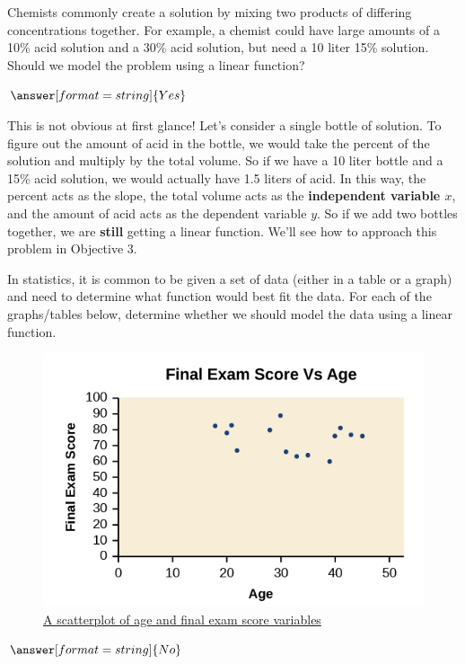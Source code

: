 \documentclass{ximera}
\begin{document}
\begin{question}
Chemists commonly create a solution by mixing two products of differing concentrations together. For example, a chemist could have large amounts of a 10\% acid solution and a 30\% acid solution, but need a 10 liter 15\% solution. Should we model the problem using a linear function?

$\answer[format=string]{Yes}$

\begin{feedback}
This is not obvious at first glance! Let's consider a single bottle of solution. To figure out the amount of acid in the bottle, we would take the percent of the solution and multiply by the total volume. So if we have a 10 liter bottle and a 15\% acid solution, we would actually have 1.5 liters of acid. In this way, the percent acts as the slope, the total volume acts as the \textbf{independent variable $x$}, and the amount of acid acts as the dependent variable $y$. So if we add two bottles together, we are \textbf{still} getting a linear function. We'll see how to approach this problem in Objective 3.
\end{feedback}

\end{question}

In statistics, it is common to be given a set of data (either in a table or a graph) and need to determine what function would best fit the data. For each of the graphs/tables below, determine whether we should model the data using a linear function. 
\begin{question}
\begin{figure}
\includegraphics[scale=0.4]{finalExamVsAge.png}
\caption{\href{https://cnx.org/contents/mwjClAV_@8.12:6dX4RGdg@12/Fitting-Linear-Models-to-Data}{A scatterplot of age and final exam score variables}}
\end{figure}
$\answer[format=string]{No}$
\end{question}
\end{document}
